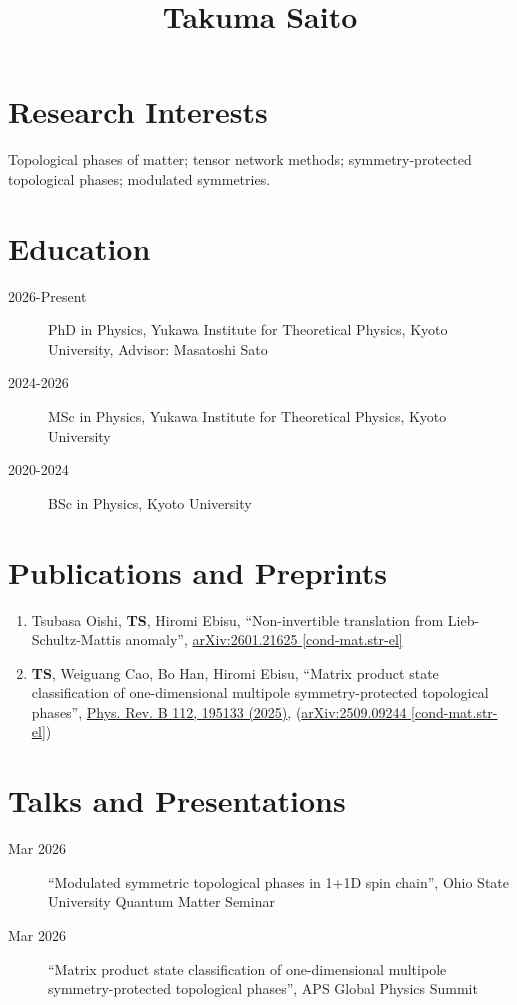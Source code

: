 \documentclass[dvipdfmx]{article}
\title{Takuma Saito}
\date{}
\begin{document}
\maketitle

\section*{Research Interests}

Topological phases of matter; tensor network methods; symmetry-protected topological phases; modulated symmetries.

\section*{Education}

\begin{description}
    \item[2026-Present] PhD in Physics, Yukawa Institute for Theoretical Physics, Kyoto University, Advisor: Masatoshi Sato
    \item[2024-2026] MSc in Physics, Yukawa Institute for Theoretical Physics, Kyoto University
    \item[2020-2024] BSc in Physics, Kyoto University
\end{description}


\section*{Publications and Preprints}

\begin{enumerate}
    \item Tsubasa Oishi, \textbf{TS}, Hiromi Ebisu, ``Non-invertible translation from Lieb-Schultz-Mattis anomaly'', \href{https://arxiv.org/abs/2601.21625}{arXiv:2601.21625 [cond-mat.str-el]}
    \item \textbf{TS}, Weiguang Cao, Bo Han, Hiromi Ebisu, ``Matrix product state classification of one-dimensional multipole symmetry-protected topological phases'', \href{https://link.aps.org/doi/10.1103/6txg-7hy7}{Phys. Rev. B 112, 195133 (2025)}, (\href{https://arxiv.org/abs/2509.09244}{arXiv:2509.09244 [cond-mat.str-el]})
\end{enumerate}


\section*{Talks and Presentations}

\begin{description}
    \item[Mar 2026] ``Modulated symmetric topological phases in 1+1D spin chain'', Ohio State University Quantum Matter Seminar
    \item[Mar 2026] ``Matrix product state classification of one-dimensional multipole symmetry-protected topological phases'', APS Global Physics Summit
\end{description}
\end{document}
